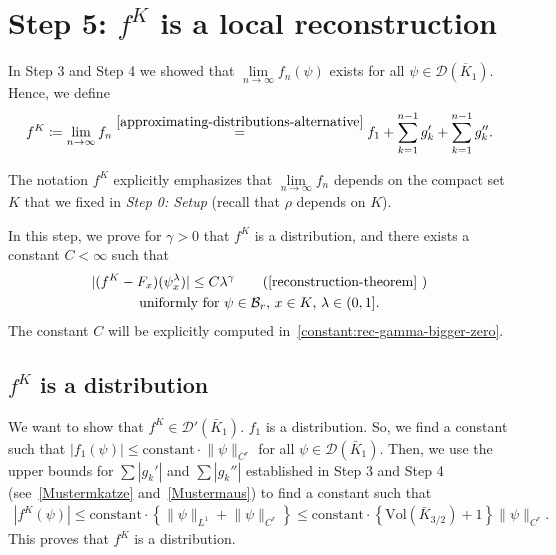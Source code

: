 \section{Step 5: \texorpdfstring{\(f^K\) is a local reconstruction}{fK satisfies the reconstruction theorem}}

In Step 3 and Step 4 we showed that \(\lim\limits_{n \to \infty}f_n(\psi)\) exists for all \(\psi \in \mathcal{D}(\overline{K}_1)\). Hence, we define
\begin{align*}
    f^K \coloneqq \lim\limits_{n \to \infty}f_n \overset{\eqref{approximating-distributions-alternative}}{=} f_1 + \sum^{n-1}_{k=1} g_k' + \sum^{n-1}_{k=1} g_k''.
\end{align*}

\begin{remark}
    The notation \(f^K\) explicitly emphasizes that \(\lim\limits_{n \to \infty}f_n\) depends on the compact set \(K\) that we fixed in \emph{Step 0: Setup} (recall that \(\rho\) depends on \(K\)).
\end{remark}
 
In this step, we prove for \(\gamma > 0\) that \(f^K\) is a distribution, and there exists a constant \(C < \infty\) such that 
\begin{gather*}
    |(f^K - F_x)(\psi^\lambda_x)| \leq C \lambda^\gamma \tag{\ref{reconstruction-theorem}
    }\\ 
    \text{uniformly for \(\psi \in \mathcal{B}_r\), \(x \in K\), \(\lambda \in (0,1]\)}.
\end{gather*}
The constant \(C\) will be explicitly computed in~\eqref{constant:rec-gamma-bigger-zero}. 

\subsection*{\(f^K\) is a distribution} 

We want to show that \(f^K \in \mathcal{D}'(\bar K_1)\). \(f_1\) is a distribution. So, we find a constant such that \(|f_1(\psi)| \leq \mathrm{constant} \cdot \lVert \psi \rVert_{C^r}\) for all \(\psi \in \mathcal{D}(\bar K_1)\). Then, we use the upper bounds for \(\sum |g_k'|\) and \(\sum |g_k''|\) established in Step 3 and Step 4 (see~\eqref{Mustermkatze} and~\eqref{Mustermaus}) to find a constant such that  
\begin{align*}
    |f^K(\psi)| \leq \mathrm{constant} \cdot \left\{ \lVert \psi\rVert_{L^1} + \lVert \psi\rVert_{C^r} \right\} \leq  \mathrm{constant} \cdot \left\{  \mathrm{Vol}(\bar K_{3/2}) + 1 \right\} \lVert \psi \rVert_{C^r}.
\end{align*}
This proves that \(f^K\) is a distribution. 


